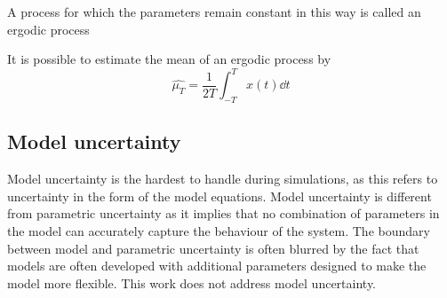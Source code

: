 A process for which the parameters remain constant in this way is
called an ergodic process

It is possible to estimate the mean of an ergodic process by 
\begin{equation}
  \hat{\mu_T} = \frac{1}{2T} \int_{-T}^{T} x(t) \dd t
\end{equation}


\subsection{Model uncertainty}
Model uncertainty is the hardest to handle during simulations, as this
refers to uncertainty in the form of the model equations.  Model
uncertainty is different from parametric uncertainty as it implies
that no combination of parameters in the model can accurately capture
the behaviour of the system.  The boundary between model and
parametric uncertainty is often blurred by the fact that models are
often developed with additional parameters designed to make the model
more flexible.  This work does not address model uncertainty.


